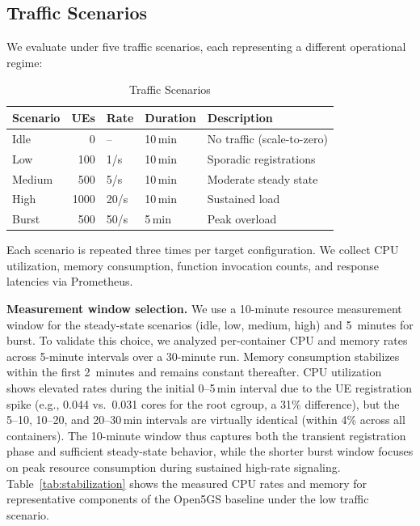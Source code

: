 \documentclass[conference]{IEEEtran}
\begin{document}
\subsection{Traffic Scenarios}

We evaluate under five traffic scenarios, each representing a different operational regime:

\begin{table}[t]
\centering
\caption{Traffic Scenarios}
\label{tab:scenarios}
\small
\begin{tabular}{@{}lrlll@{}}
\toprule
\textbf{Scenario} & \textbf{UEs} & \textbf{Rate} & \textbf{Duration} & \textbf{Description} \\
\midrule
Idle   & 0    & --       & 10\,min & No traffic (scale-to-zero) \\
Low    & 100  & 1/s      & 10\,min & Sporadic registrations \\
Medium & 500  & 5/s      & 10\,min & Moderate steady state \\
High   & 1000 & 20/s     & 10\,min & Sustained load \\
Burst  & 500  & 50/s     & 5\,min  & Peak overload \\
\bottomrule
\end{tabular}
\end{table}

Each scenario is repeated three times per target configuration. We collect CPU utilization, memory consumption, function invocation counts, and response latencies via Prometheus.

\textbf{Measurement window selection.} We use a 10-minute resource measurement window for the steady-state scenarios (idle, low, medium, high) and 5~minutes for burst. To validate this choice, we analyzed per-container CPU and memory rates across 5-minute intervals over a 30-minute run. Memory consumption stabilizes within the first 2~minutes and remains constant thereafter. CPU utilization shows elevated rates during the initial 0--5\,min interval due to the UE registration spike (e.g., 0.044 vs.\ 0.031 cores for the root cgroup, a 31\% difference), but the 5--10, 10--20, and 20--30\,min intervals are virtually identical (within 4\% across all containers). The 10-minute window thus captures both the transient registration phase and sufficient steady-state behavior, while the shorter burst window focuses on peak resource consumption during sustained high-rate signaling. Table~\ref{tab:stabilization} shows the measured CPU rates and memory for representative components of the Open5GS baseline under the low traffic scenario.
\end{document}
